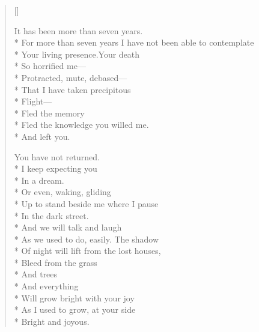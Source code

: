 \label{ch:the_nature_of_loss}
\settowidth{\versewidth}{For more than seven years I have not been able to contemplate}
\begin{verse}[\versewidth]

It has been more than seven years.\\*
For more than seven years I have not been able to contemplate\\*
Your living presence.\quad Your death\\*
So horrified me---\\*
Protracted, mute, debased---\\*
That I have taken precipitous \\*
Flight---\\*
Fled the memory\\*
Fled the knowledge you willed me.\\*
And left you.

You have not returned.\\*
I keep expecting you\\*
In a dream.\\*
Or even, waking, gliding\\*
Up to stand beside me where I pause\\*
In the dark street.\\*
And we will talk and laugh\\*
As we used to do, easily.  The shadow\\*
Of night will lift from the lost houses,\\*
Bleed from the grass\\*
And trees\\*
And everything\\*
Will grow bright with your joy \\*
As I used to grow, at your side\\*
Bright and joyous.
\end{verse}
